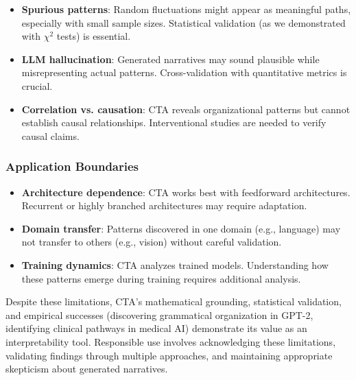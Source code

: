 \begin{itemize}
    \item \textbf{Spurious patterns}: Random fluctuations might appear as meaningful paths, especially with small sample sizes. Statistical validation (as we demonstrated with $\chi^2$ tests) is essential.
    \item \textbf{LLM hallucination}: Generated narratives may sound plausible while misrepresenting actual patterns. Cross-validation with quantitative metrics is crucial.
    \item \textbf{Correlation vs. causation}: CTA reveals organizational patterns but cannot establish causal relationships. Interventional studies are needed to verify causal claims.
\end{itemize}

\subsubsection{Application Boundaries}

\begin{itemize}
    \item \textbf{Architecture dependence}: CTA works best with feedforward architectures. Recurrent or highly branched architectures may require adaptation.
    \item \textbf{Domain transfer}: Patterns discovered in one domain (e.g., language) may not transfer to others (e.g., vision) without careful validation.
    \item \textbf{Training dynamics}: CTA analyzes trained models. Understanding how these patterns emerge during training requires additional analysis.
\end{itemize}

Despite these limitations, CTA's mathematical grounding, statistical validation, and empirical successes (discovering grammatical organization in GPT-2, identifying clinical pathways in medical AI) demonstrate its value as an interpretability tool. Responsible use involves acknowledging these limitations, validating findings through multiple approaches, and maintaining appropriate skepticism about generated narratives.
